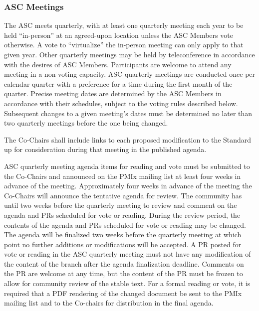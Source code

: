 \documentclass{article}
\begin{document}
\hypertarget{gov-asc-meetings}{%
\subsubsection{ASC Meetings}%
\label{gov-asc-meetings}}

The ASC meets quarterly, with at least one quarterly meeting each year
to be held ``in-person'' at an agreed-upon location unless the ASC
Members vote otherwise. A vote to ``virtualize'' the in-person meeting
can only apply to that given year. Other quarterly meetings may be held
by teleconference in accordance with the desires of ASC Members.
Participants are welcome to attend any meeting in a non-voting capacity.
ASC quarterly meetings are conducted once per calendar quarter with a
preference for a time during the first month of the quarter. Precise
meeting dates are determined by the ASC Members in accordance with their
schedules, subject to the voting rules described below. Subsequent
changes to a given meeting's dates must be determined no later than two
quarterly meetings before the one being changed.

The Co-Chairs shall include links to each proposed modification to the
Standard up for consideration during that meeting in the published
agenda.

ASC quarterly meeting agenda items for reading and vote must be submitted to the Co-Chairs
and announced on the PMIx mailing list at least four weeks in advance of the meeting. Approximately four weeks in advance of
the meeting the Co-Chairs will announce the tentative agenda for review.
The community has until two weeks before the quarterly meeting to review and comment on
the agenda and PRs scheduled for vote or reading. During the review period, the contents of the agenda and PRs scheduled for vote or reading may be changed. The agenda will be finalized two weeks before the quarterly
meeting at which point no further additions or modifications will be accepted.
A PR posted for vote or reading in the ASC quarterly meeting must not have
any modification of the content of the branch after the agenda finalization
deadline. Comments on the PR are welcome at any time, but the content of the
PR must be frozen to allow for community review of the stable text. For a
formal reading or vote, it is required that a PDF rendering of the changed document
be sent to the PMIx mailing list and to the Co-chairs for distribution in the final agenda.
\end{document}
